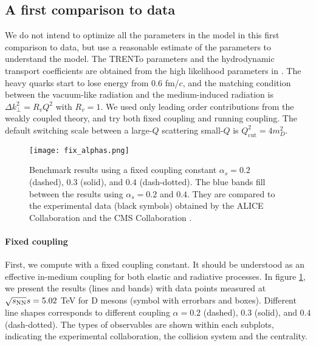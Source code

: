 \subsection{A first comparison to data}
We do not intend to optimize all the parameters in the model in this first comparison to data, but use a reasonable estimate of the parameters to understand the model.
The TRENTo parameters and the hydrodynamic transport coefficients are obtained from the high likelihood parameters in \cite{Bernhard:2018hnz}.
The heavy quarks start to lose energy from $0.6$ fm/$c$, and the matching condition between the vacuum-like radiation and the medium-induced radiation is $\Delta k_\perp^2 = R_v Q^2$ with $R_v = 1$.
We used only leading order contributions from the weakly coupled theory, and try both fixed coupling and running coupling.
The default switching scale between a large-$Q$ scattering small-$Q$ is $Q_{\textrm{cut}}^2 = 4 m_D^2$.

\begin{figure}
\singlespacing
\centering
\texttt{[image: fix\_alphas.png]}
\caption[Benchmark results using a fixed coupling constant $\alpha_s = 0.2$ (dashed),]{Benchmark results using a fixed coupling constant $\alpha_s = 0.2$ (dashed), $0.3$ (solid), and $0.4$ (dash-dotted). The blue bands fill between the results using $\alpha_s=0.2$ and $0.4$. They are compared to the experimental data (black symbols) obtained by the ALICE Collaboration \cite{Acharya:2017qps,Acharya:2018hre} and the CMS Collaboration \cite{Sirunyan:2017xss,Sirunyan:2017plt}.}
\label{fig:new:fix-a}
\end{figure}

\paragraph{Fixed coupling} First, we compute with a fixed coupling constant.
It should be understood as an effective in-medium coupling for both elastic and radiative processes.
In figure \ref{fig:new:fix-a}, we present the results (lines and bands) with data points measured at $\sqrt{s_\mathrm{NN}}{s} = 5.02$ TeV for D mesons (symbol with errorbars and boxes).
Different line shapes corresponds to different coupling $\alpha=0.2$ (dashed), $0.3$ (solid), and $0.4$ (dash-dotted). 
The types of observables are shown within each subplots, indicating the experimental collaboration, the collision system and the centrality.

